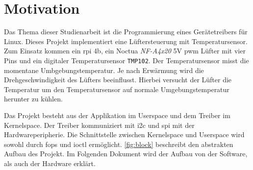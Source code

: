 \section{Motivation}

Das Thema dieser Studienarbeit ist die Programmierung eines Gerätetreibers für Linux.
Dieses Projekt implementiert eine Lüftersteuerung mit Temperatursensor.
Zum Einsatz kommen ein \gls{rpi} 4b, ein Noctua \textit{NF-A4x20} 5V \gls{pwm} Lüfter mit vier Pins und ein digitaler Temperatursensor \texttt{TMP102}.
Der Temperatursensor misst die momentane Umbgebungstemperatur.
Je nach Erwärmung wird die Drehgeschwindigkeit des Lüfters beeinflusst.
Hierbei versucht der Lüfter die Temperatur um den Temperatursensor auf normale Umgebungstemperatur herunter zu kühlen.

Das Projekt besteht aus der Applikation im Userspace und dem Treiber im Kernelspace.
Der Treiber kommuniziert mit \gls{i2c} und \gls{spi} mit der Hardwareperipherie.
Die Schnittstelle zwischen Kernelspace und Userspace wird sowohl durch \gls{fops} und \gls{ioctl} ermöglicht.
\autoref{fig:block} beschreibt den abstrakten Aufbau des Projekt.
Im Folgenden Dokument wird der Aufbau von der Software, als auch der Hardware erklärt.


